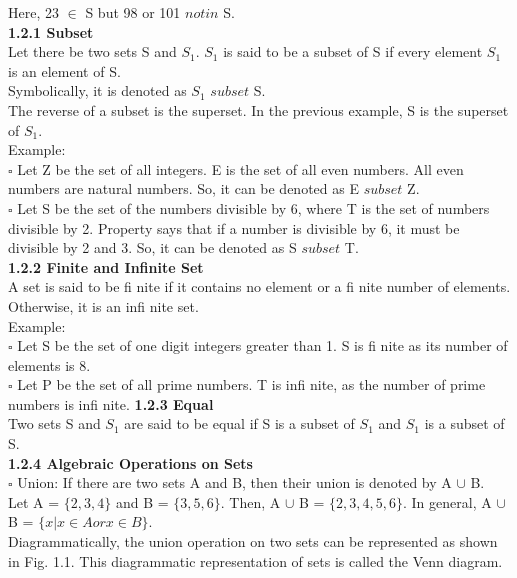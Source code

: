 \documentclass[12pt,a4paper]{book}
\def\firstcircle{(0,0) circle (1.5cm)}
\def\secondcircle{(0:2cm) circle (1.5cm)}
\begin{document}
Here, 23 $\in$ S but 98 or 101 $notin$ S.\\
\textbf{1.2.1 Subset} \\
Let there be two sets S and $S_1$. $S_1$ is said to be a subset of S if every element $S_1$ is an element of S.\\
Symbolically, it is denoted as $S_1$ $subset$ S.\\
The reverse of a subset is the superset. In the previous example, S is the superset of $S_1$.\\
Example:\\
$\square$ Let Z be the set of all integers. E is the set of all even numbers. All even numbers are natural
numbers. So, it can be denoted as E $subset$ Z.\\
$\square$ Let S be the set of the numbers divisible by 6, where T is the set of numbers divisible by 2. Property
says that if a number is divisible by 6, it must be divisible by 2 and 3. So, it can be denoted as S $subset$ T.\\
\textbf{1.2.2 Finite and Infinite Set} \\
A set is said to be fi nite if it contains no element or a fi nite number of elements. Otherwise, it is an
infi nite set.\\
Example:\\
$\square$ Let S be the set of one digit integers greater than 1. S is fi nite as its number of elements is 8.\\
$\square$ Let P be the set of all prime numbers. T is infi nite, as the number of prime numbers is infi nite.
\newpage
\textbf{1.2.3 Equal} \\
Two sets S and $S_1$ are said to be equal if S is a subset of $S_1$ and $S_1$ is a subset of S.\\
\textbf{1.2.4 Algebraic Operations on Sets} \\
$\square$ Union: If there are two sets A and B, then their union is denoted by A $\cup$ B.\\
Let A = $\{2, 3, 4\}$ and B = $\{3, 5, 6\}$. Then, A $\cup$ B = $\{2, 3, 4, 5, 6\}$. In
general, A $\cup$ B = $\{x | x \in A or x \in B\}$.\\
Diagrammatically, the union operation on two sets can be represented
as shown in Fig. 1.1. This diagrammatic representation of sets is called
the Venn diagram.
\begin{center}
\end{center}
\end{document}
